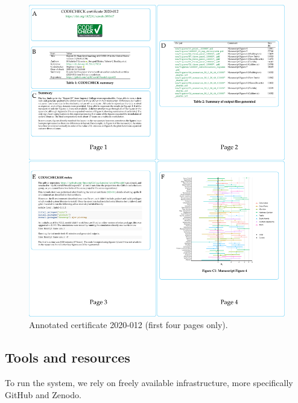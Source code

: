 \documentclass[12pt]{article}
\begin{document}
\begin{figure}
  \centering
  \includegraphics[width=\textwidth]{figs/annotate-cert-crop.pdf}
  \caption{Annotated certificate 2020-012 \cite{cert-2020-012} (first four pages only).}
  \label{fig:cert}
\end{figure}

\subsection*{Tools and resources}\label{tools}

To run the system, we rely on freely available infrastructure, more 
specifically GitHub and Zenodo.
\end{document}

